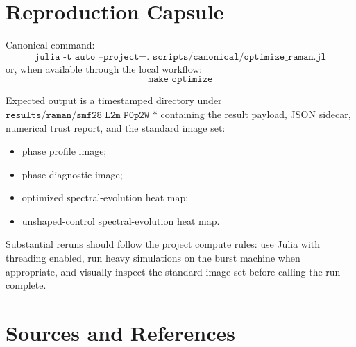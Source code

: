 \documentclass[11pt]{article}
\begin{document}
\section{Reproduction Capsule}

Canonical command:
\[
\texttt{julia -t auto --project=. scripts/canonical/optimize\_raman.jl}
\]
or, when available through the local workflow:
\[
\texttt{make optimize}
\]

Expected output is a timestamped directory under
\(\texttt{results/raman/smf28\_L2m\_P0p2W\_*}\) containing the result payload,
JSON sidecar, numerical trust report, and the standard image set:
\begin{itemize}
    \item phase profile image;
    \item phase diagnostic image;
    \item optimized spectral-evolution heat map;
    \item unshaped-control spectral-evolution heat map.
\end{itemize}

Substantial reruns should follow the project compute rules: use Julia with
threading enabled, run heavy simulations on the burst machine when appropriate,
and visually inspect the standard image set before calling the run complete.

\section{Sources and References}
\end{document}
